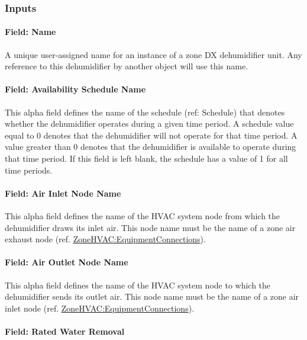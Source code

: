\subsubsection{Inputs}\label{inputs-12-021}

\paragraph{Field: Name}\label{field-name-12-014}

A unique user-assigned name for an instance of a zone DX dehumidifier unit. Any reference to this dehumidifier by another object will use this name.

\paragraph{Field: Availability Schedule Name}\label{field-availability-schedule-name-11-001}

This alpha field defines the name of the schedule (ref: Schedule) that denotes whether the dehumidifier operates during a given time period. A schedule value equal to 0 denotes that the dehumidifier will not operate for that time period. A value greater than 0 denotes that the dehumidifier is available to operate during that time period. If this field is left blank, the schedule has a value of 1 for all time periods.

\paragraph{Field: Air Inlet Node Name}\label{field-air-inlet-node-name-9-000}

This alpha field defines the name of the HVAC system node from which the dehumidifier draws its inlet air. This node name must be the name of a zone air exhaust node (ref. \hyperref[zonehvacequipmentconnections]{ZoneHVAC:EquipmentConnections}).

\paragraph{Field: Air Outlet Node Name}\label{field-air-outlet-node-name-9-001}

This alpha field defines the name of the HVAC system node to which the dehumidifier sends its outlet air. This node name must be the name of a zone air inlet node (ref. \hyperref[zonehvacequipmentconnections]{ZoneHVAC:EquipmentConnections}).

\paragraph{Field: Rated Water Removal}\label{field-rated-water-removal}

